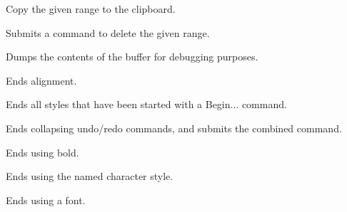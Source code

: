 
Copy the given range to the clipboard.

\label{wxrichtextbufferdeleterangewithundo}


Submits a command to delete the given range.

\label{wxrichtextbufferdump}



Dumps the contents of the buffer for debugging purposes.

\label{wxrichtextbufferendalignment}


Ends alignment.

\label{wxrichtextbufferendallstyles}


Ends all styles that have been started with a Begin... command.

\label{wxrichtextbufferendbatchundo}


Ends collapsing undo/redo commands, and submits the combined command.

\label{wxrichtextbufferendbold}


Ends using bold.

\label{wxrichtextbufferendcharacterstyle}


Ends using the named character style.

\label{wxrichtextbufferendfont}


Ends using a font.

